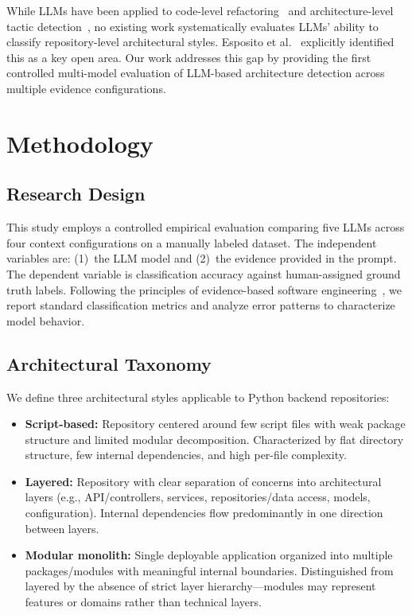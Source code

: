 \documentclass[runningheads]{llncs}
\begin{document}
While LLMs have been applied to code-level refactoring~\cite{martinez2025refactoring} \cite{pucho2025refactoring} \cite{xu2025mantra} and architecture-level tactic detection~\cite{shokri2024ipsynth}, no existing work systematically evaluates LLMs' ability to classify repository-level architectural styles. Esposito et al.~\cite{esposito2025generative} explicitly identified this as a key open area. Our work addresses this gap by providing the first controlled multi-model evaluation of LLM-based architecture detection across multiple evidence configurations.

\section{Methodology}
\label{sec:methodology}

\subsection{Research Design}

This study employs a controlled empirical evaluation comparing five LLMs across four context configurations on a manually labeled dataset. The independent variables are: (1)~the LLM model and (2)~the evidence provided in the prompt. The dependent variable is classification accuracy against human-assigned ground truth labels. Following the principles of evidence-based software engineering~\cite{bass2021software}, we report standard classification metrics and analyze error patterns to characterize model behavior.

\subsection{Architectural Taxonomy}
\label{sec:taxonomy}

We define three architectural styles applicable to Python backend repositories:

\begin{itemize}[nosep]
    \item \textbf{Script-based:} Repository centered around few script files with weak package structure and limited modular decomposition. Characterized by flat directory structure, few internal dependencies, and high per-file complexity.
    \item \textbf{Layered:} Repository with clear separation of concerns into architectural layers (e.g., API/controllers, services, repositories/data access, models, configuration). Internal dependencies flow predominantly in one direction between layers.
    \item \textbf{Modular monolith:} Single deployable application organized into multiple packages/modules with meaningful internal boundaries. Distinguished from layered by the absence of strict layer hierarchy---modules may represent features or domains rather than technical layers.
\end{itemize}
\end{document}
